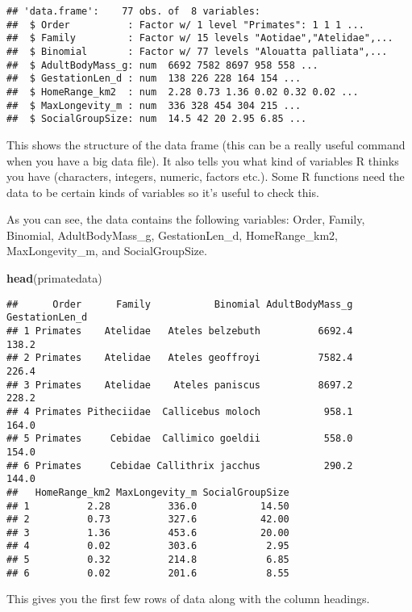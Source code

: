 \documentclass[11pt]{article}
\newcommand{\KeywordTok}[1]{\textcolor[rgb]{0.13,0.29,0.53}{\textbf{{#1}}}}
\newcommand{\NormalTok}[1]{{#1}}
\begin{document}
\begin{verbatim}
## 'data.frame':    77 obs. of  8 variables:
##  $ Order          : Factor w/ 1 level "Primates": 1 1 1 ...
##  $ Family         : Factor w/ 15 levels "Aotidae","Atelidae",...
##  $ Binomial       : Factor w/ 77 levels "Alouatta palliata",...
##  $ AdultBodyMass_g: num  6692 7582 8697 958 558 ...
##  $ GestationLen_d : num  138 226 228 164 154 ...
##  $ HomeRange_km2  : num  2.28 0.73 1.36 0.02 0.32 0.02 ...
##  $ MaxLongevity_m : num  336 328 454 304 215 ...
##  $ SocialGroupSize: num  14.5 42 20 2.95 6.85 ...
\end{verbatim}

This shows the structure of the data frame (this can be a really useful
command when you have a big data file). It also tells you what kind of
variables R thinks you have (characters, integers, numeric, factors
etc.). Some R functions need the data to be certain kinds of variables
so it's useful to check this.

As you can see, the data contains the following variables: Order,
Family, Binomial, AdultBodyMass\_g, GestationLen\_d, HomeRange\_km2,
MaxLongevity\_m, and SocialGroupSize.

\begin{snugshade}
\begin{Highlighting}[]
\KeywordTok{head}\NormalTok{(primatedata)}
\end{Highlighting}
\end{snugshade}

\begin{verbatim}
##      Order      Family           Binomial AdultBodyMass_g GestationLen_d
## 1 Primates    Atelidae   Ateles belzebuth          6692.4          138.2
## 2 Primates    Atelidae   Ateles geoffroyi          7582.4          226.4
## 3 Primates    Atelidae    Ateles paniscus          8697.2          228.2
## 4 Primates Pitheciidae  Callicebus moloch           958.1          164.0
## 5 Primates     Cebidae  Callimico goeldii           558.0          154.0
## 6 Primates     Cebidae Callithrix jacchus           290.2          144.0
##   HomeRange_km2 MaxLongevity_m SocialGroupSize
## 1          2.28          336.0           14.50
## 2          0.73          327.6           42.00
## 3          1.36          453.6           20.00
## 4          0.02          303.6            2.95
## 5          0.32          214.8            6.85
## 6          0.02          201.6            8.55
\end{verbatim}

This gives you the first few rows of data along with the column
headings.
\end{document}
